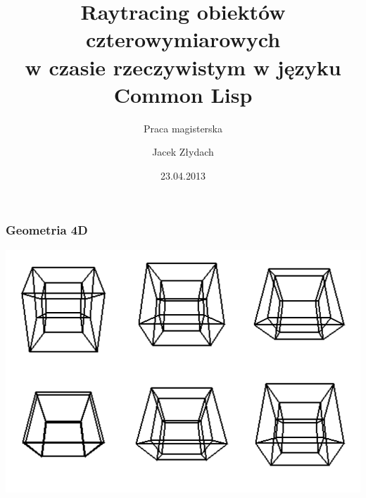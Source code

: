 \documentclass{beamer}
\title[Realtime 4D raytracing]{Raytracing obiektów czterowymiarowych\\ w czasie rzeczywistym w języku\\Common Lisp}
\subtitle{Praca magisterska}
\author[J. Złydach]{Jacek Złydach}
\date[2013]{23.04.2013}
\institute[AGH-UST]
{Wydział Elektrotechniki, Automatyki,\\
Informatyki i Inżynierii Biomedycznej
}
\begin{document}
{
 \begin{frame}
   \titlepage
 \end{frame}
}



\begin{frame}
\frametitle{Geometria 4D}

\includegraphics[scale=0.65]{hypercube-rotating.png}

\end{frame}

\end{document}

